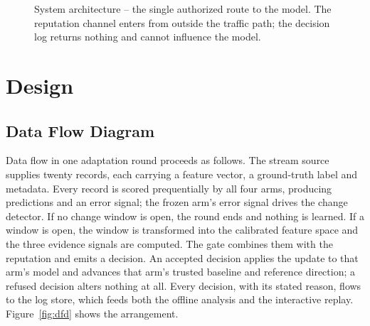 \documentclass[12pt,a4paper]{report}
\begin{document}
\begin{figure}[htbp]
\caption{System architecture -- the single authorized route to the model. The
reputation channel enters from outside the traffic path; the decision log returns
nothing and cannot influence the model.}
\label{fig:arch}
\end{figure}

\section{Design}

\subsection{Data Flow Diagram}

Data flow in one adaptation round proceeds as follows. The stream source supplies
twenty records, each carrying a feature vector, a ground-truth label and
metadata. Every record is scored prequentially by all four arms, producing
predictions and an error signal; the frozen arm's error signal drives the change
detector. If no change window is open, the round ends and nothing is learned. If
a window is open, the window is transformed into the calibrated feature space and
the three evidence signals are computed. The gate combines them with the
reputation and emits a decision. An accepted decision applies the update to that
arm's model and advances that arm's trusted baseline and reference direction; a
refused decision alters nothing at all. Every decision, with its stated reason,
flows to the log store, which feeds both the offline analysis and the interactive
replay. Figure~\ref{fig:dfd} shows the arrangement.
\end{document}
